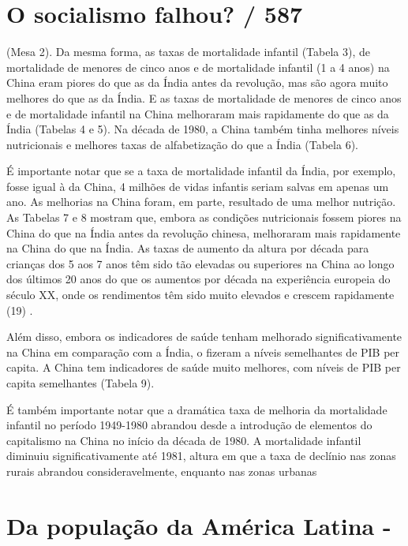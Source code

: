 {{\section{O socialismo falhou? / 587}
 \par 
(Mesa {\color{blue}2}). Da mesma forma, as taxas de mortalidade infantil (Tabela {\color{blue}3}), de mortalidade de menores de cinco anos e de mortalidade infantil (1 a {\color{blue}4} anos) na China eram piores do que as da Índia antes da revolução, mas são agora muito melhores do que as da Índia. E as taxas de mortalidade de menores de cinco anos e de mortalidade infantil na China melhoraram mais rapidamente do que as da Índia (Tabelas {\color{blue}4} e {\color{blue}5}). Na década de 1980, a China também tinha melhores níveis nutricionais e melhores taxas de alfabetização do que a Índia (Tabela {\color{blue}6}).
 \par 
É importante notar que se a taxa de mortalidade infantil da Índia, por exemplo, fosse igual à da China, {\color{blue}4} milhões de vidas infantis seriam salvas em apenas um ano. As melhorias na China foram, em parte, resultado de uma melhor nutrição. As Tabelas {\color{blue}7} e {\color{blue}8} mostram que, embora as condições nutricionais fossem piores na China do que na Índia antes da revolução chinesa, melhoraram mais rapidamente na China do que na Índia. As taxas de aumento da altura por década para crianças dos {\color{blue}5} aos {\color{blue}7} anos têm sido tão elevadas ou superiores na China ao longo dos últimos {\color{blue}20} anos do que os aumentos por década na experiência europeia do século XX, onde os rendimentos têm sido muito elevados e crescem rapidamente (19) .
 \par 
Além disso, embora os indicadores de saúde tenham melhorado significativamente na China em comparação com a Índia, o fizeram a níveis semelhantes de PIB per capita. A China tem indicadores de saúde muito melhores, com níveis de PIB per capita semelhantes (Tabela {\color{blue}9}).
 \par 
É também importante notar que a dramática taxa de melhoria da mortalidade infantil no período 1949-1980 abrandou desde a introdução de elementos do capitalismo na China no início da década de 1980. A mortalidade infantil diminuiu significativamente até 1981, altura em que a taxa de declínio nas zonas rurais abrandou consideravelmente, enquanto nas zonas urbanas
 \par 
\section{Da população da América Latina -}
 \par 
}}
